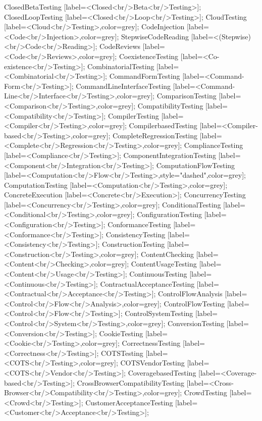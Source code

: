 \documentclass{article}
\begin{document}
{ClosedBetaTesting [label=<Closed<br/>Beta<br/>Testing>];
ClosedLoopTesting [label=<Closed<br/>Loop<br/>Testing>];
CloudTesting [label=<Cloud<br/>Testing>,color=grey];
CodeInjection [label=<Code<br/>Injection>,color=grey];
StepwiseCodeReading [label=<(Stepwise)<br/>Code<br/>Reading>];
CodeReviews [label=<Code<br/>Reviews>,color=grey];
CoexistenceTesting [label=<Co-existence<br/>Testing>];
CombinatorialTesting [label=<Combinatorial<br/>Testing>];
CommandFormTesting [label=<Command-Form<br/>Testing>];
CommandLineInterfaceTesting [label=<Command-Line<br/>Interface<br/>Testing>,color=grey];
ComparisonTesting [label=<Comparison<br/>Testing>,color=grey];
CompatibilityTesting [label=<Compatibility<br/>Testing>];
CompilerTesting [label=<Compiler<br/>Testing>,color=grey];
CompilerbasedTesting [label=<Compiler-based<br/>Testing>,color=grey];
CompleteRegressionTesting [label=<Complete<br/>Regression<br/>Testing>,color=grey];
ComplianceTesting [label=<Compliance<br/>Testing>];
ComponentIntegrationTesting [label=<Component<br/>Integration<br/>Testing>];
ComputationFlowTesting [label=<Computation<br/>Flow<br/>Testing>,style="dashed",color=grey];
ComputationTesting [label=<Computation<br/>Testing>,color=grey];
ConcreteExecution [label=<Concrete<br/>Execution>];
ConcurrencyTesting [label=<Concurrency<br/>Testing>,color=grey];
ConditionalTesting [label=<Conditional<br/>Testing>,color=grey];
ConfigurationTesting [label=<Configuration<br/>Testing>];
ConformanceTesting [label=<Conformance<br/>Testing>];
ConsistencyTesting [label=<Consistency<br/>Testing>];
ConstructionTesting [label=<Construction<br/>Testing>,color=grey];
ContentChecking [label=<Content<br/>Checking>,color=grey];
ContentUsageTesting [label=<Content<br/>Usage<br/>Testing>];
ContinuousTesting [label=<Continuous<br/>Testing>];
ContractualAcceptanceTesting [label=<Contractual<br/>Acceptance<br/>Testing>];
ControlFlowAnalysis [label=<Control<br/>Flow<br/>Analysis>,color=grey];
ControlFlowTesting [label=<Control<br/>Flow<br/>Testing>];
ControlSystemTesting [label=<Control<br/>System<br/>Testing>,color=grey];
ConversionTesting [label=<Conversion<br/>Testing>];
CookieTesting [label=<Cookie<br/>Testing>,color=grey];
CorrectnessTesting [label=<Correctness<br/>Testing>];
COTSTesting [label=<COTS<br/>Testing>,color=grey];
COTSVendorTesting [label=<COTS<br/>Vendor<br/>Testing>];
CoveragebasedTesting [label=<Coverage-based<br/>Testing>];
CrossBrowserCompatibilityTesting [label=<Cross-Browser<br/>Compatibility<br/>Testing>,color=grey];
CrowdTesting [label=<Crowd<br/>Testing>];
CustomerAcceptanceTesting [label=<Customer<br/>Acceptance<br/>Testing>];
}
\end{document}
